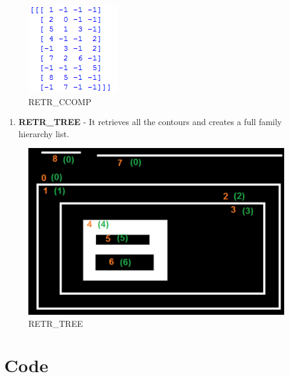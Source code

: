 \documentclass[]{article}
\providecommand{\tightlist}{%
  \setlength{\itemsep}{0pt}\setlength{\parskip}{0pt}}
\begin{document}
\begin{figure}[htbp]
\centering
\includegraphics{ccomp.png}
\caption{RETR\_CCOMP}
\end{figure}

\begin{enumerate}
\def\labelenumi{\arabic{enumi}.}
\setcounter{enumi}{3}
\tightlist
\item
  \textbf{RETR\_TREE} - It retrieves all the contours and creates a full
  family hierarchy list.
\end{enumerate}

\begin{figure}[htbp]
\centering
\includegraphics{tree_hierarchy.png}
\caption{RETR\_TREE}
\end{figure}

\section{Code}\label{code}
\end{document}
